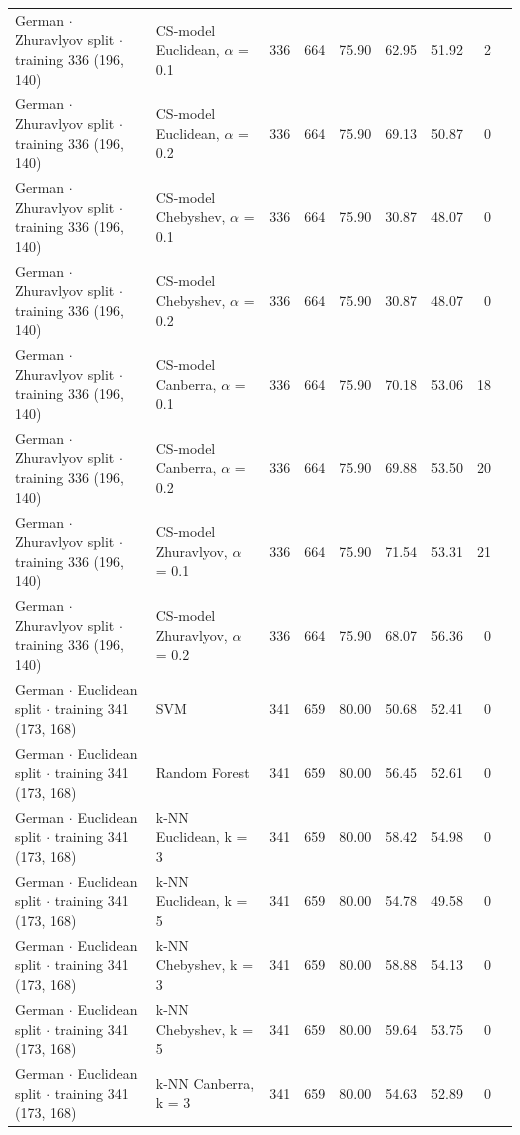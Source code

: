 \begin{longtable}{llrrrrrrl}
  German $\cdot$ Zhuravlyov split $\cdot$ training 336 (196, 140) & CS-model Euclidean, $\alpha$ = 0.1 & 336 & 664 & 75.90 & 62.95 & 51.92 & 2 &  \\
  German $\cdot$ Zhuravlyov split $\cdot$ training 336 (196, 140) & CS-model Euclidean, $\alpha$ = 0.2 & 336 & 664 & 75.90 & 69.13 & 50.87 & 0 &  \\
  German $\cdot$ Zhuravlyov split $\cdot$ training 336 (196, 140) & CS-model Chebyshev, $\alpha$ = 0.1 & 336 & 664 & 75.90 & 30.87 & 48.07 & 0 &  \\
  German $\cdot$ Zhuravlyov split $\cdot$ training 336 (196, 140) & CS-model Chebyshev, $\alpha$ = 0.2 & 336 & 664 & 75.90 & 30.87 & 48.07 & 0 &  \\
  German $\cdot$ Zhuravlyov split $\cdot$ training 336 (196, 140) & CS-model Canberra, $\alpha$ = 0.1 & 336 & 664 & 75.90 & 70.18 & 53.06 & 18 &  \\
  German $\cdot$ Zhuravlyov split $\cdot$ training 336 (196, 140) & CS-model Canberra, $\alpha$ = 0.2 & 336 & 664 & 75.90 & 69.88 & 53.50 & 20 &  \\
  German $\cdot$ Zhuravlyov split $\cdot$ training 336 (196, 140) & CS-model Zhuravlyov, $\alpha$ = 0.1 & 336 & 664 & 75.90 & 71.54 & 53.31 & 21 &  \\
  German $\cdot$ Zhuravlyov split $\cdot$ training 336 (196, 140) & CS-model Zhuravlyov, $\alpha$ = 0.2 & 336 & 664 & 75.90 & 68.07 & 56.36 & 0 &  \\
  German $\cdot$ Euclidean split $\cdot$ training 341 (173, 168) & SVM & 341 & 659 & 80.00 & 50.68 & 52.41 & 0 &  \\
  German $\cdot$ Euclidean split $\cdot$ training 341 (173, 168) & Random Forest & 341 & 659 & 80.00 & 56.45 & 52.61 & 0 &  \\
  German $\cdot$ Euclidean split $\cdot$ training 341 (173, 168) & k-NN Euclidean, k = 3 & 341 & 659 & 80.00 & 58.42 & 54.98 & 0 &  \\
  German $\cdot$ Euclidean split $\cdot$ training 341 (173, 168) & k-NN Euclidean, k = 5 & 341 & 659 & 80.00 & 54.78 & 49.58 & 0 &  \\
  German $\cdot$ Euclidean split $\cdot$ training 341 (173, 168) & k-NN Chebyshev, k = 3 & 341 & 659 & 80.00 & 58.88 & 54.13 & 0 &  \\
  German $\cdot$ Euclidean split $\cdot$ training 341 (173, 168) & k-NN Chebyshev, k = 5 & 341 & 659 & 80.00 & 59.64 & 53.75 & 0 &  \\
  German $\cdot$ Euclidean split $\cdot$ training 341 (173, 168) & k-NN Canberra, k = 3 & 341 & 659 & 80.00 & 54.63 & 52.89 & 0 &  \\

\end{longtable}
